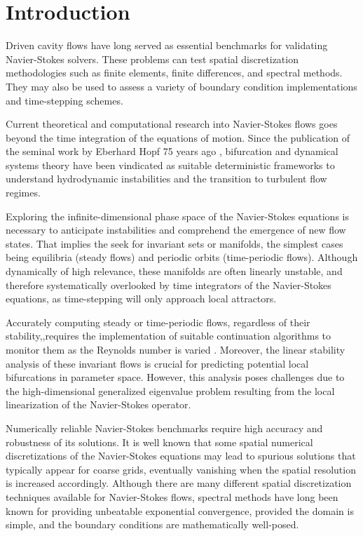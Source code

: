 
\section{Introduction} \label{sec:intro}

Driven cavity flows have long served as essential benchmarks for validating
Navier-Stokes solvers. These problems can test spatial discretization
methodologies such as finite elements, finite differences, and spectral
methods. They may also be used to assess a variety of boundary condition
implementations and time-stepping schemes.

Current theoretical and computational research into Navier-Stokes flows goes
beyond the time integration of the equations of motion. Since the publication
of the seminal work by Eberhard Hopf 75 years ago \citep{hopf1948}, bifurcation
and dynamical systems theory have been vindicated as suitable deterministic
frameworks to understand hydrodynamic instabilities and the transition to
turbulent flow regimes.

Exploring the infinite-dimensional phase space of the Navier-Stokes equations
is necessary to anticipate instabilities and comprehend the emergence of new
flow states. That implies the seek for invariant sets or manifolds, the
simplest cases being equilibria (steady flows) and periodic orbits
(time-periodic flows). Although dynamically of high relevance, these manifolds
are often linearly unstable, and therefore systematically overlooked by time
integrators of the Navier-Stokes equations, as time-stepping will only approach
local attractors.

Accurately computing steady or time-periodic flows, regardless of their
stability,,requires the implementation of suitable continuation algorithms to
monitor them as the Reynolds number is varied \citep{kuznetsov2004}. Moreover,
the linear stability analysis of these invariant flows is crucial for
predicting potential local bifurcations in parameter space. However, this
analysis poses challenges due to the high-dimensional generalized eigenvalue
problem resulting from the local linearization of the Navier-Stokes operator.

Numerically reliable Navier-Stokes benchmarks require high accuracy and
robustness of its solutions. It is well known that some spatial numerical
discretizations of the Navier-Stokes equations may lead to spurious solutions
that typically appear for coarse grids, eventually vanishing when the spatial
resolution is increased accordingly. Although there are many different spatial
discretization techniques available for Navier-Stokes flows, spectral methods
have long been known for providing unbeatable exponential convergence, provided
the domain is simple, and the boundary conditions are mathematically
well-posed.

